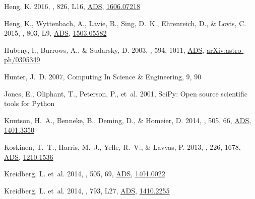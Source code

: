 \documentclass[tighten, times, twocolumn]{aastex61}  %
\newcommand{\eprint}[1]{\href{http://arxiv.org/abs/#1}{#1}}
\renewcommand{\eprint}[1]{\href{http://arxiv.org/abs/#1}{#1}}
\providecommand{\adsurl}[1]{\href{#1}{ADS}}
\begin{document}
\begin{thebibliography}{50}
{Heng}, K. 2016, \apjl, 826, L16,
  \adsurl{http://adsabs.harvard.edu/abs/2016ApJ...826L..16H},
  \eprint{1606.07218}

{Heng}, K., {Wyttenbach}, A., {Lavie}, B., {Sing}, D.~K., {Ehrenreich}, D., \&
  {Lovis}, C. 2015, \apjl, 803, L9,
  \adsurl{http://adsabs.harvard.edu/abs/2015ApJ...803L...9H},
  \eprint{1503.05582}

{Hubeny}, I., {Burrows}, A., \& {Sudarsky}, D. 2003, \apj, 594, 1011,
  \adsurl{http://adsabs.harvard.edu/abs/2003ApJ...594.1011H},
  \eprint{arXiv:astro-ph/0305349}

Hunter, J.~D. 2007, Computing In Science \& Engineering, 9, 90

{Jones}, E., {Oliphant}, T., {Peterson}, P., {et~al.} 2001, {SciPy}: Open
  source scientific tools for {Python}

{Knutson}, H.~A., {Benneke}, B., {Deming}, D., \& {Homeier}, D. 2014, \nat,
  505, 66, \adsurl{http://adsabs.harvard.edu/abs/2014Natur.505...66K},
  \eprint{1401.3350}

{Koskinen}, T.~T., {Harris}, M.~J., {Yelle}, R.~V., \& {Lavvas}, P. 2013,
  \icarus, 226, 1678,
  \adsurl{http://adsabs.harvard.edu/abs/2013Icar..226.1678K},
  \eprint{1210.1536}

{Kreidberg}, L. {et~al.} 2014{}, \nat, 505, 69,
  \adsurl{http://adsabs.harvard.edu/abs/2014Natur.505...69K},
  \eprint{1401.0022}

{Kreidberg}, L. {et~al.} 2014{}, \apjl, 793, L27,
  \adsurl{http://adsabs.harvard.edu/abs/2014ApJ...793L..27K},
  \eprint{1410.2255}


\end{thebibliography}
\end{document}
